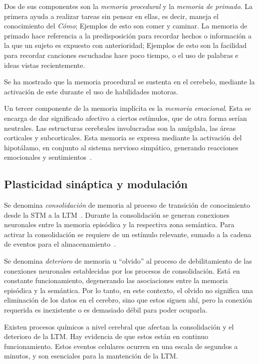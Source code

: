 Dos de sus componentes son la \textit{memoria procedural} y la \textit{memoria de primado}. La primera ayuda a realizar tareas sin pensar en ellas, es decir, maneja el conocimiento del \textit{Cómo}; Ejemplos de esto son comer y caminar. La memoria de primado hace referencia a la predisposición para recordar hechos o información a la que un sujeto es expuesto con anterioridad; Ejemplos de esto son la facilidad para recordar canciones escuchadas hace poco tiempo, o el uso de palabras e ideas vistas recientemente.

Se ha mostrado que la memoria procedural se sustenta en el cerebelo, mediante la activación de este durante el uso de habilidades motoras.

Un tercer componente de la memoria implícita es la \textit{memoria emocional}. Esta se encarga de dar significado afectivo a ciertos estímulos, que de otra forma serían neutrales. Las estructuras cerebrales involucradas son la amígdala, las áreas corticales y subcorticales. Esta memoria se expresa mediante la activación del hipotálamo, en conjunto al sistema nervioso simpático, generando reacciones emocionales y sentimientos~\cite{episodic_philip}.


\subsection{Plasticidad sináptica y modulación}

Se denomina \textit{consolidación} de memoria al proceso de transición de conocimiento desde la STM a la LTM~\cite{Bailey13445}. Durante la consolidación se generan conexiones neuronales entre la memoria episódica y la respectiva zona semántica. Para activar la consolidación se requiere de un estímulo relevante, sumado a la cadena de eventos para el almacenamiento~\cite{Eichenbaum:2008}.

Se denomina \textit{deterioro} de memoria u ``olvido'' al proceso de debilitamiento de las conexiones neuronales establecidas por los procesos de consolidación. Está en constante funcionamiento, degenerando las asociaciones entre la memoria episódica y la semántica. Por lo tanto, en este contexto, el olvido no significa una eliminación de los datos en el cerebro, sino que estos siguen ahí, pero la conexión requerida es inexistente o es demasiado débil para poder ocuparla.

Existen procesos químicos a nivel cerebral que afectan la consolidación y el deterioro de la LTM. Hay evidencia de que estos están en continuo funcionamiento. Estos eventos celulares ocurren en una escala de segundos a minutos, y son esenciales para la mantención de la LTM.

